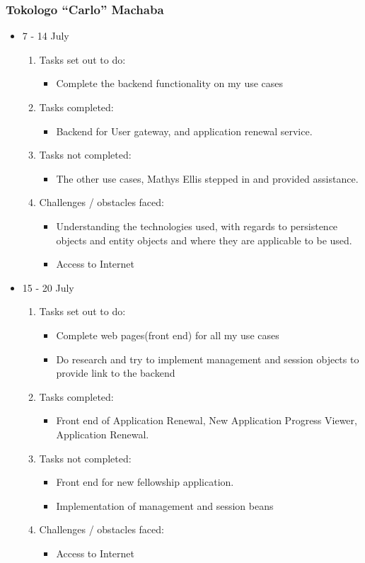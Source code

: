 \documentclass[12pt]{article}
\begin{document}
\subsubsection{Tokologo “Carlo” Machaba}
\begin{itemize}
	\item 7 - 14 July
	\begin{enumerate}
	\item Tasks set out to do:
	\begin{itemize}
		\item Complete the backend functionality on my use cases
	\end{itemize}
	\item Tasks completed:
	\begin{itemize}
		\item Backend for User gateway, and application renewal service.
	\end{itemize}
	\item Tasks not completed:
	\begin{itemize}
		\item The other use cases, Mathys Ellis stepped in and provided assistance.
	\end{itemize}	
	\item Challenges / obstacles faced:
	\begin{itemize}
		\item Understanding the technologies used, with regards to persistence objects and entity objects and where they are applicable to be used.
		\item Access to Internet
	\end{itemize}
	\end{enumerate}
	\item 15 - 20 July
	\begin{enumerate}
	\item Tasks set out to do:
	\begin{itemize}
		\item Complete web pages(front end) for all my use cases
		\item Do research and try to implement management and session objects to provide link to the backend
	\end{itemize}
	\item Tasks completed:
	\begin{itemize}
		\item Front end of Application Renewal, New Application Progress Viewer, Application Renewal.
	\end{itemize}
	\item Tasks not completed:
	\begin{itemize}
		\item Front end for new fellowship application.
		\item Implementation of management and session beans
	\end{itemize}	
	\item Challenges / obstacles faced:
	\begin{itemize}
		\item Access to Internet
	\end{itemize}
	\end{enumerate}	 
\end{itemize}
\end{document}
